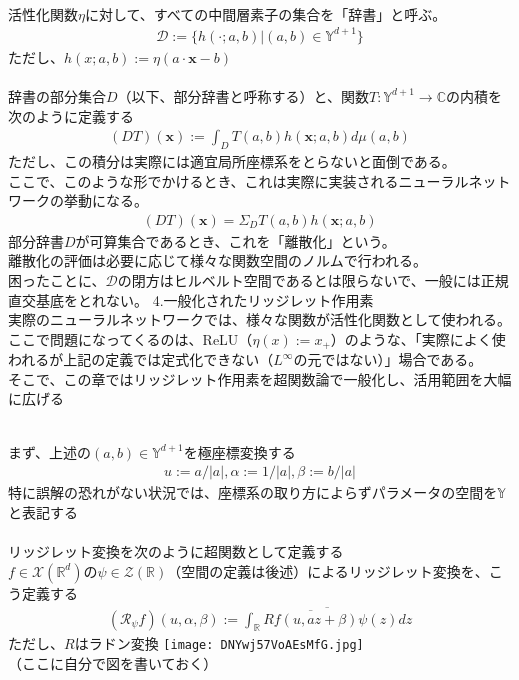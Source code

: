 \documentclass{jsarticle}
\begin{document}
　\\
活性化関数$\eta$に対して、すべての中間層素子の集合を「辞書」と呼ぶ。
\begin{eqnarray}
\mathcal{D}:=\{h(\cdot;a,b)|(a,b)\in\mathbb{Y}^{d+1}\}
\end{eqnarray}
ただし、$h(x;a,b):=\eta(a\cdot\bm{x}-b)$\\
　\\
辞書の部分集合$D$（以下、部分辞書と呼称する）と、関数$T:\mathbb{Y}^{d+1}\rightarrow\mathbb{C}$の内積を次のように定義する
\begin{eqnarray}
(DT)(\bm{x}):=\int_D T(a,b)h(\bm{x};a,b)d\mu(a,b)
\end{eqnarray}
ただし、この積分は実際には適宜局所座標系をとらないと面倒である。\\
ここで、このような形でかけるとき、これは実際に実装されるニューラルネットワークの挙動になる。
\begin{eqnarray}
(DT)(\bm{x})=\Sigma_D T(a,b)h(\bm{x};a,b)
\end{eqnarray}
部分辞書$D$が可算集合であるとき、これを「離散化」という。\\
離散化の評価は必要に応じて様々な関数空間のノルムで行われる。\\
困ったことに、$\mathcal{D}$の閉方はヒルベルト空間であるとは限らないで、一般には正規直交基底をとれない。
\newpage
4.一般化されたリッジレット作用素\\
実際のニューラルネットワークでは、様々な関数が活性化関数として使われる。\\
ここで問題になってくるのは、ReLU（$\eta(x):=x_+$）のような、「実際によく使われるが上記の定義では定式化できない（$L^\infty$の元ではない）」場合である。\\
そこで、この章ではリッジレット作用素を超関数論で一般化し、活用範囲を大幅に広げる

　\\
まず、上述の$(a,b)\in\mathbb{Y}^{d+1}$を極座標変換する
\begin{eqnarray}
u:=a/|a|,\alpha:=1/|a|,\beta:=b/|a|
\end{eqnarray}
特に誤解の恐れがない状況では、座標系の取り方によらずパラメータの空間を$\mathbb{Y}$と表記する\\
　\\
リッジレット変換を次のように超関数として定義する\\
$f\in\mathcal{X}(\mathbb{R}^d)$の$\psi\in\mathcal{Z}(\mathbb{R})$（空間の定義は後述）によるリッジレット変換を、こう定義する
\begin{eqnarray}
(\mathcal{R}_\psi f)(u,\alpha,\beta):=\overline{\int_{\mathbb{R}}\overline{Rf(u,az+\beta)}\psi(z)dz}
\end{eqnarray}
ただし、$R$はラドン変換
\texttt{[image: DNYwj57VoAEsMfG.jpg]}\\
（ここに自分で図を書いておく）\\
\end{document}
